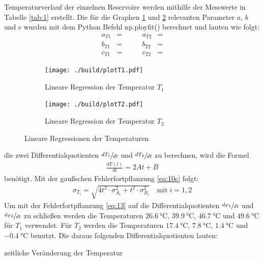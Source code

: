\justifying Temperaturverlauf der einzelnen Reservoire werden mithilfe der Messwerte in Tabelle \ref{tab:1} erstellt. Die für
die Graphen \ref{fig:3a} und \ref{fig:3b} relevanten Parameter $a$, $b$ und $c$ wurden mit dem Python Befehl np.ployfit() \cite{numpy}
berechnet und lauten wie folgt:
\begin{subequations}
\begin{align}
    a_{T1} &= \text{} \qquad &a_{T2} &= \text{} \label{eq:11a}\\
    b_{T1} &= \text{} \qquad &b_{T2} &= \text{} \label{eq:11b}\\
    c_{T1} &= \text{} \qquad &c_{T2} &= \text{} \label{eq:11c}
\end{align}
\end{subequations}

\begin{figure}[H]
    \begin{subfigure}{0.495\linewidth}
        \centering
        \texttt{[image: ./build/plotT1.pdf]}
        \caption{Lineare Regression der Temperatur $T_1$}
        \label{fig:3a}
    \end{subfigure}
    \begin{subfigure}{0.495\linewidth}
        \centering
        \texttt{[image: ./build/plotT2.pdf]}
        \caption{Lineare Regression der Temperatur $T_2$}
        \label{fig:3b}
    \end{subfigure}
    \caption{Lineare Regressionen der Temperaturen}
    \label{fig:3}
\end{figure}

\justifying die zwei Differentialquotienten $\sfrac{dT_{1}}{dt}$ und $\sfrac{dT_{2}}{dt}$ zu berechnen, wird die Formel
\begin{align}
    \frac{dT(t)}{dt} = 2At + B \label{eq:12}
\end{align}
benötigt. Mit der gaußschen Fehlerfortpflanzung \eqref{eq:10c} folgt:
\begin{align}
    \sigma_{T_i} = \sqrt{4t^2 \cdot \sigma _{A_i}^2 + t^2 \cdot \sigma _{B_i}^2} \label{eq:13}\quad \text{mit}\; i = 1,2
\end{align}
Um mit der Fehlerfortpflanzung \eqref{eq:13} auf die Differentialquotienten $\sfrac{d_{T1}}{dt}$ und $\sfrac{d_{T2}}{dt}$ zu schließen werden die 
Temperaturen $\SI{26.6}{\celsius}$, $\SI{39.9}{\celsius}$, $\SI{46.7}{\celsius}$ und $\SI{49.6}{\celsius}$ für $T_1$ verwendet. Für $T_2$ 
werden die Temperaturen $\SI{17.4}{\celsius}$, $\SI{7.8}{\celsius}$, $\SI{1.4}{\celsius}$ und $\SI{-0.4}{\celsius}$ benutzt.
Die daraus folgenden Differentialquotienten lauten:
\begin{table}[H]
    \centering
    
    \caption{zeitliche Veränderung der Temperatur} \label{tab:2}
\end{table}


